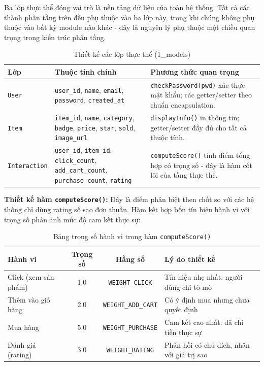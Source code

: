\documentclass{report}
\begin{document}
Ba lớp thực thể đóng vai trò là nền tảng dữ liệu của toàn hệ thống. Tất cả các thành phần tầng trên đều phụ thuộc vào ba lớp này, trong khi chúng không phụ thuộc vào bất kỳ module nào khác - đây là nguyên lý phụ thuộc một chiều quan trọng trong kiến trúc phân tầng.

\begin{table}[H]
    \centering
    \renewcommand{\arraystretch}{1.4}
    \begin{tabularx}{\textwidth}{|l|>{\raggedright\arraybackslash}X|>{\raggedright\arraybackslash}X|}
        \hline
        \textbf{Lớp} & \textbf{Thuộc tính chính} & \textbf{Phương thức quan trọng} \\ \hline
        \texttt{User} & \texttt{user\_id}, \texttt{name}, \texttt{email}, \texttt{password}, \texttt{created\_at} & \texttt{checkPassword(pwd)} xác thực mật khẩu; các getter/setter theo chuẩn encapsulation. \\ \hline
        \texttt{Item} & \texttt{item\_id}, \texttt{name}, \texttt{category}, \texttt{badge}, \texttt{price}, \texttt{star}, \texttt{sold}, \texttt{image\_url} & \texttt{displayInfo()} in thông tin; getter/setter đầy đủ cho tất cả thuộc tính. \\ \hline
        \texttt{Interaction} & \texttt{user\_id}, \texttt{item\_id}, \texttt{click\_count}, \texttt{add\_cart\_count}, \texttt{purchase\_count}, \texttt{rating} & \texttt{computeScore()} tính điểm tổng hợp có trọng số - đây là hàm cốt lõi của tầng thực thể. \\ \hline
    \end{tabularx}
    \caption{Thiết kế các lớp thực thể (1\_models)}
    \label{tab:thiet_ke_entity}
\end{table}

\textbf{Thiết kế hàm \texttt{computeScore()}:} Đây là điểm phân biệt then chốt so với các hệ thống chỉ dùng rating số sao đơn thuần. Hàm kết hợp bốn tín hiệu hành vi với trọng số phản ánh mức độ cam kết thực sự:

\begin{table}[H]
    \centering
    \renewcommand{\arraystretch}{1.4}
    \begin{tabularx}{\textwidth}{|l|c|c|>{\raggedright\arraybackslash}X|}
        \hline
        \textbf{Hành vi} & \textbf{Trọng số} & \textbf{Hằng số} & \textbf{Lý do thiết kế} \\ \hline
        Click (xem sản phẩm) & 1.0 & \texttt{WEIGHT\_CLICK} & Tín hiệu nhẹ nhất: người dùng chỉ tò mò \\ \hline
        Thêm vào giỏ hàng & 2.0 & \texttt{WEIGHT\_ADD\_CART} & Có ý định mua nhưng chưa quyết định \\ \hline
        Mua hàng & 5.0 & \texttt{WEIGHT\_PURCHASE} & Cam kết cao nhất: đã chi tiền thực sự \\ \hline
        Đánh giá (rating) & 3.0 & \texttt{WEIGHT\_RATING} & Phản hồi có chủ đích, nhân với giá trị sao \\ \hline
    \end{tabularx}
    \caption{Bảng trọng số hành vi trong hàm \texttt{computeScore()}}
    \label{tab:trong_so}
\end{table}
\end{document}
